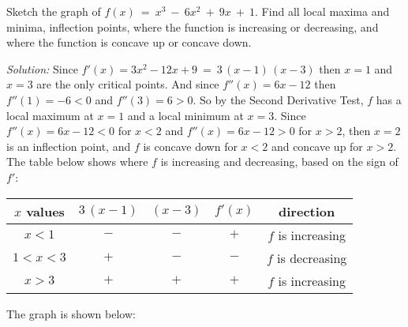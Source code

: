 \begin{exmp}\label{exmp:graph1}
\noindent Sketch the graph of $f(x) ~=~ x^3 ~-~ 6x^2 ~+~ 9x ~+~ 1$. Find all
local maxima and minima, inflection points, where the function is increasing or decreasing,
and where the function is concave up or concave down.\vspace{1mm}
\par\noindent\emph{Solution:} Since $f'(x) = 3x^2 - 12x + 9 ~=~ 3\,(x-1)\,(x-3)$
then $x=1$ and $x=3$ are the only critical points. And since $f''(x) = 6x-12$
then $f''(1) = -6 < 0$ and $f''(3) = 6 > 0$. So by the Second Derivative Test,
$f$ has a local maximum at $x=1$ and a local minimum at $x=3$. Since
$f''(x) = 6x-12 < 0$ for $x<2$ and $f''(x) = 6x-12 > 0$ for $x>2$, then $x=2$ is
an inflection point, and $f$ is concave down for $x <2$ and concave up for $x>2$.
The table below shows where $f$ is increasing and decreasing, based on the sign
of $f'$:

\begin{center}
\begin{tabular}{@{}c|c|c||c|c@{}}
  $x$ values & $3\,(x-1)$ & $(x-3)$ & $f'(x)$ & direction\\
  \hline
  \hline
  $x < 1$ & $-$ & $-$ & $+$ & $f$ is increasing\\
  \hline
  $1 < x < 3$ & $+$ & $-$ & $-$ & $f$ is decreasing\\
  \hline
  $x > 3$ & $+$ & $+$ & $+$ & $f$ is increasing\\
  \hline
\end{tabular}
\end{center}

\noindent The graph is shown below:
\begin{center}\vspace{-3mm}

\end{center}
\end{exmp}\vspace{-2mm}
\divider
\newpage
